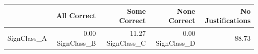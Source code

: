 \begin{tabular}{lrrrr}
\toprule
 & All Correct & Some Correct & None Correct & No Justifications \\
\midrule
SignClass_A & 0.00%
SignClass_B & 11.27%
SignClass_C & 0.00%
SignClass_D & 88.73%
\bottomrule
\end{tabular}
